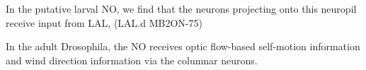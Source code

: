 
    In the putative larval NO, we find that the neurons projecting onto this neuropil receive input from LAL, (LAL.d MB2ON-75)





    In the adult Drosophila, the NO receives optic flow-based self-motion information and wind direction information via the columnar neurons. %

